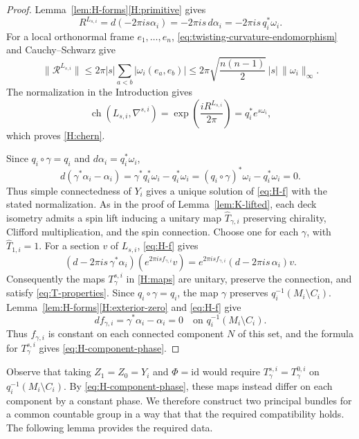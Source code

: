 \documentclass[12pt,reqno]{amsart}
\numberwithin{equation}{section}
\theoremstyle{definition}
\newcommand{\ch}{\operatorname{ch}}
\newcommand{\cR}{\mathcal R}
\begin{document}
\begin{proof}
Lemma~\ref{lem:H-forms}\ref{H:primitive} gives
\[
 R^{L_{s,i}}=d(-2\pi is\alpha_i)
 =-2\pi is\,d\alpha_i=-2\pi is\,q_i^*\omega_i.
\]
For a local orthonormal
frame $e_1,\ldots,e_n$, \eqref{eq:twisting-curvature-endomorphism}
and Cauchy--Schwarz give
\[
 \|\cR^{L_{s,i}}\|
 \leq2\pi|s|\sum_{a<b}|\omega_i(e_a,e_b)|
 \leq2\pi\sqrt{\frac{n(n-1)}2}\,|s|\,\|\omega_i\|_\infty.
\]
The normalization in the Introduction gives
\[
 \ch(L_{s,i},\nabla^{s,i})
 =\exp\!\left(\frac{iR^{L_{s,i}}}{2\pi}\right)
 =q_i^*e^{s\omega_i},
\]
which proves \ref{H:chern}.

Since $q_i\circ\gamma=q_i$ and $d\alpha_i=q_i^*\omega_i$,
\[
 d(\gamma^*\alpha_i-\alpha_i)
 =\gamma^*q_i^*\omega_i-q_i^*\omega_i
 =(q_i\circ\gamma)^*\omega_i-q_i^*\omega_i=0.
\]
Thus simple connectedness of $Y_i$ gives a unique solution of
\eqref{eq:H-f} with the stated
normalization.  As in the proof of
Lemma~\ref{lem:K-lifted}, each deck isometry admits a spin lift
inducing a unitary map $\widehat T_{\gamma,i}$
preserving chirality, Clifford multiplication, and the spin connection.
Choose one for each $\gamma$, with $\widehat T_{1,i}=1$.
For a section $v$ of $L_{s,i}$, \eqref{eq:H-f} gives
\[
 (d-2\pi is\,\gamma^*\alpha_i)
       (e^{2\pi isf_{\gamma,i}}v)
 =e^{2\pi isf_{\gamma,i}}
       (d-2\pi is\,\alpha_i)v.
\]
Consequently the maps $T^{s,i}_\gamma$ in \ref{H:maps} are unitary,
preserve the connection, and satisfy \eqref{eq:T-properties}.
Since $q_i\circ\gamma=q_i$, the map $\gamma$ preserves
$q_i^{-1}(M_i\setminus C_i)$.  Lemma~\ref{lem:H-forms}\ref{H:exterior-zero}
and \eqref{eq:H-f} give
\[
 df_{\gamma,i}=\gamma^*\alpha_i-\alpha_i=0
 \quad\text{on }q_i^{-1}(M_i\setminus C_i).
\]
Thus $f_{\gamma,i}$ is constant on each connected component $N$ of
this set, and the formula for $T^{s,i}_\gamma$ gives
\eqref{eq:H-component-phase}.
\end{proof}

Observe that taking $Z_1=Z_0=Y_i$ and $\Phi=\mathrm{id}$ would require $T^{s,i}_\gamma=T^{0,i}_\gamma$
on $q_i^{-1}(M_i\setminus C_i)$. By \eqref{eq:H-component-phase}, these maps instead
differ on each component by a constant phase. We therefore
construct two principal bundles for a common countable group in a way that that the required compatibility holds. The following lemma provides the required data.
\end{document}
